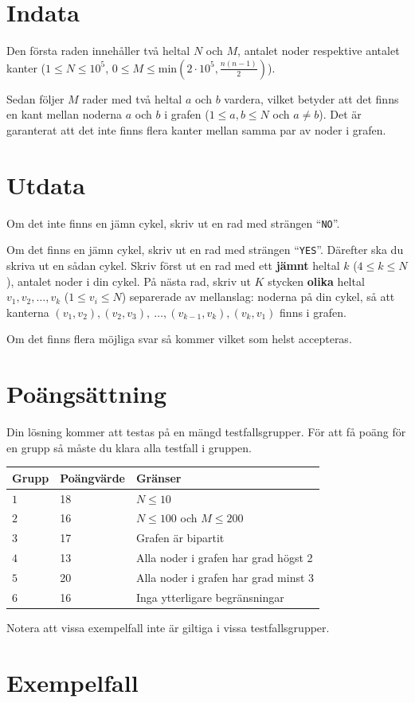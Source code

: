 \section*{Indata}

Den första raden innehåller två heltal $N$ och $M$, antalet noder respektive antalet kanter
($1\le N \le 10^5$, $0\le M \le \mathrm{min}(2\cdot 10^5, \tfrac{n(n-1)}{2})$).

Sedan följer $M$ rader med två heltal $a$ och $b$ vardera, vilket betyder att det finns en kant mellan noderna $a$ och $b$ i grafen ($1\le a, b \le N$ och $a\neq b$). Det är garanterat att det inte finns flera kanter mellan samma par av noder i grafen.

\section*{Utdata}
Om det inte finns en jämn cykel, skriv ut en rad med strängen ``\texttt{NO}''.

Om det finns en jämn cykel, skriv ut en rad med strängen ``\texttt{YES}''. Därefter ska du skriva ut en sådan cykel. Skriv först ut en rad med ett \textbf{jämnt} heltal $k$ ($4\le k \le N$), antalet noder i din cykel. På nästa rad, skriv ut $K$ stycken \textbf{olika} heltal $v_{1}, v_{2}, \ldots, v_{k}$ ($1\le v_{i}\le N$) separerade av mellanslag: noderna på din cykel, så att kanterna $(v_{1},v_{2}), (v_{2},v_{3}),\ \ldots, (v_{k-1},v_{k}), (v_{k}, v_{1})$ finns i grafen.

Om det finns flera möjliga svar så kommer vilket som helst accepteras.

\section*{Poängsättning}
Din lösning kommer att testas på en mängd testfallsgrupper.
För att få poäng för en grupp så måste du klara alla testfall i gruppen.

\noindent
\begin{tabular}{| l | l | l |}
  \hline
  Grupp & Poängvärde & Gränser \\ \hline \hline
  $1$ & 18 & $N\le 10$
  \\ \hline
  $2$ & 16 & $N\le 100$ och $M\le 200$
  \\ \hline
  $3$  & 17 & Grafen är bipartit
  \\ \hline
  $4$  & 13 & Alla noder i grafen har grad högst 2
  \\ \hline
  $5$  & 20 & Alla noder i grafen har grad minst 3
  \\ \hline
  $6$  & 16 & Inga ytterligare begränsningar
  \\ \hline
\end{tabular}

\noindent Notera att vissa exempelfall inte är giltiga i vissa testfallsgrupper.

\section*{Exempelfall}
